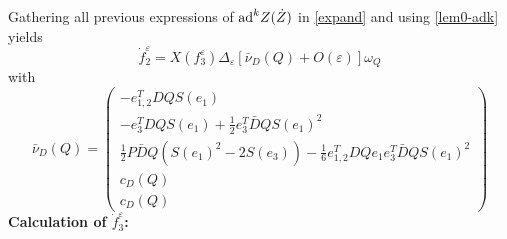 \documentclass[a4paper,twoside]{article}
\def \ad {\textnormal{ad}}
\def \eps {\varepsilon}
\begin{document}
Gathering all previous expressions of $\ad^k Z (\dot Z)$ in \eqref{expand} and using \eqref{lem0-adk} yields
\begin{equation}
\label{app-df2}
\dot f_2^\eps = X(f_3^\eps) \Delta_\eps \left[ \bar \nu_{D}(Q) + O(\eps) \right] \omega_Q
\end{equation}
with
\begin{equation}
\label{bnud}
 \bar \nu_{D}(Q)= 
\begin{pmatrix}
- e_{1,2}^T D Q S(e_1) \\
- e_3^T D Q S(e_1)+\frac{1}{2} e_3^T \bar D Q S(e_1)^2 \\
\frac{1}{2} P \bar D Q (S(e_1)^2 -2 S(e_3)) -\frac{1}{6}  e_{1,2}^T D Q e_1 e_3^T \bar D Q S(e_1)^2 \\
c_{D}(Q) \\
c_{D} (Q)
\end{pmatrix}
\end{equation}
\textbf{Calculation of $\dot f_3^\eps$:} 
\end{document}
